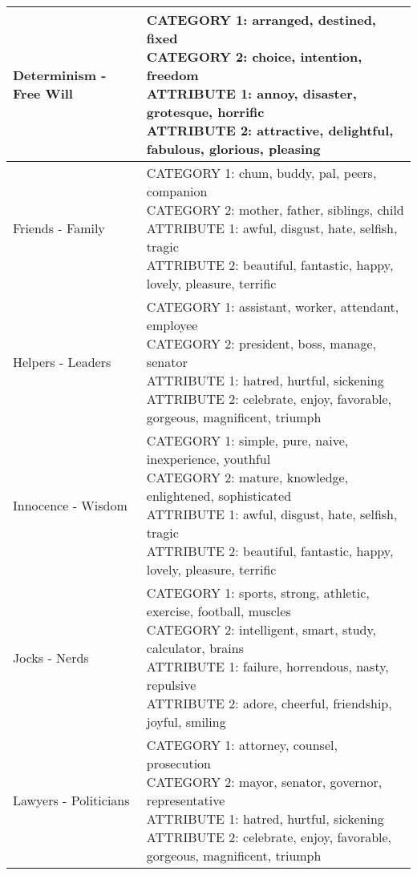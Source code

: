 \documentclass[]{article}
\begin{document}
\begin{table}[H]
\begin{tabular}{l|l}
\hline
Determinism - Free Will & \makecell[l]{CATEGORY 1:  arranged, destined, fixed \\ CATEGORY 2:  choice, intention, freedom \\ ATTRIBUTE 1:  annoy, disaster, grotesque, horrific \\ ATTRIBUTE 2:  attractive, delightful, fabulous, glorious, pleasing \\}\\
\hline
Friends - Family & \makecell[l]{CATEGORY 1:  chum, buddy, pal, peers, companion \\ CATEGORY 2:  mother, father, siblings, child \\ ATTRIBUTE 1:  awful, disgust, hate, selfish, tragic \\ ATTRIBUTE 2:  beautiful, fantastic, happy, lovely, pleasure, terrific \\}\\
\hline
Helpers - Leaders & \makecell[l]{CATEGORY 1:  assistant, worker, attendant, employee \\ CATEGORY 2:  president, boss, manage, senator \\ ATTRIBUTE 1:  hatred, hurtful, sickening \\ ATTRIBUTE 2:  celebrate, enjoy, favorable, gorgeous, magnificent, triumph \\}\\
\hline
Innocence - Wisdom & \makecell[l]{CATEGORY 1:  simple, pure, naive, inexperience, youthful \\ CATEGORY 2:  mature, knowledge, enlightened, sophisticated \\ ATTRIBUTE 1:  awful, disgust, hate, selfish, tragic \\ ATTRIBUTE 2:  beautiful, fantastic, happy, lovely, pleasure, terrific \\}\\
\hline
Jocks - Nerds & \makecell[l]{CATEGORY 1:  sports, strong, athletic, exercise, football, muscles \\ CATEGORY 2:  intelligent, smart, study, calculator, brains \\ ATTRIBUTE 1:  failure, horrendous, nasty, repulsive \\ ATTRIBUTE 2:  adore, cheerful, friendship, joyful, smiling \\}\\
\hline
Lawyers - Politicians & \makecell[l]{CATEGORY 1:  attorney, counsel, prosecution \\ CATEGORY 2:  mayor, senator, governor, representative \\ ATTRIBUTE 1:  hatred, hurtful, sickening \\ ATTRIBUTE 2:  celebrate, enjoy, favorable, gorgeous, magnificent, triumph \\}\\

\end{tabular}
\end{table}
\end{document}

